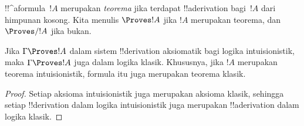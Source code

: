 \documentclass[../../../include/open-logic-section]{subfiles}
\begin{document}
\begin{defn}[Teorema]
!!^a{formula}~$!A$ merupakan \emph{teorema} jika terdapat !!a{derivation}
bagi~$!A$ dari himpunan kosong. Kita menulis $\Proves !A$ jika $!A$ merupakan
teorema, dan $\Proves/ !A$ jika bukan.
\end{defn}

\begin{prop}
  Jika $\Gamma \Proves !A$ dalam sistem !!{derivation} aksiomatik bagi logika
  intuisionistik, maka $\Gamma \Proves !A$ juga dalam logika klasik. Khususnya,
  jika $!A$ merupakan teorema intuisionistik, formula itu juga merupakan
  teorema klasik.
\end{prop}

\begin{proof}
  Setiap aksioma intuisionistik juga merupakan aksioma klasik, sehingga setiap
  !!{derivation} dalam logika intuisionistik juga merupakan !!a{derivation}
  dalam logika klasik.
\end{proof}
\end{document}
